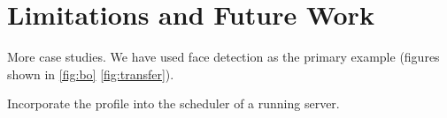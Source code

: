 \section{Limitations and Future Work}
\label{sec:limitations}

More case studies. We have used face detection as the primary example (figures
shown in \autoref{fig:bo} \autoref{fig:transfer}).

Incorporate the profile into the scheduler of a running server.

